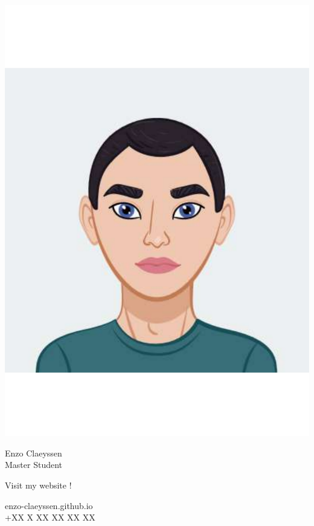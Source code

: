 \documentclass{article}
\begin{document}
\centering \includegraphics[width=.15\linewidth]{logo}\\[5pt]
\parbox{2in}{\Large \centering Enzo Claeyssen\\[1pt]
\normalsize Master Student}

\vfill
\raggedright
\begin{multicols}{2}
Visit my website !

\columnbreak
\raggedleft
enzo-claeyssen.github.io\\
+XX X XX XX XX XX%
\end{multicols}%
\end{document}
